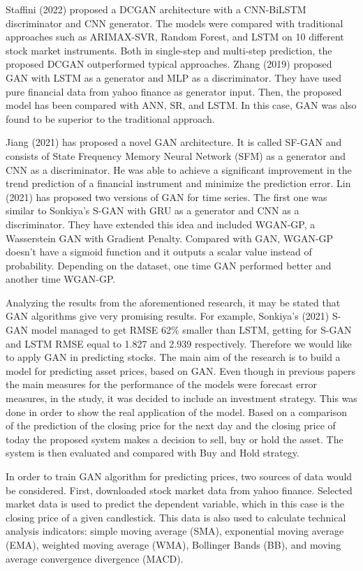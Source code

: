 \documentclass[review]{elsarticle} %
\begin{document}
Staffini (2022) proposed a DCGAN architecture with a CNN-BiLSTM discriminator and CNN generator. The models were compared with traditional approaches such as ARIMAX-SVR, Random Forest, and LSTM on 10 different stock market instruments. Both in single-step and multi-step prediction, the proposed DCGAN outperformed typical approaches. Zhang (2019) proposed GAN with LSTM as a generator and MLP as a discriminator. They have used pure financial data from yahoo finance as generator input. Then, the proposed model has been compared with ANN, SR, and LSTM. In this case, GAN was also found to be superior to the traditional approach.  

Jiang (2021) has proposed a novel GAN architecture. It is called SF-GAN and consists of 
State Frequency Memory Neural Network (SFM) as a generator and CNN as a discriminator. 
He was able to achieve a significant improvement in the trend prediction of a financial instrument and minimize the prediction error.  Lin (2021) has proposed two versions of GAN for time series. The first one was similar to Sonkiya's S-GAN with GRU as a generator and CNN as a discriminator. They have extended this idea and included WGAN-GP, a Wasserstein GAN with Gradient Penalty. Compared with GAN, WGAN-GP doesn't have a sigmoid function and it outputs a scalar value instead of probability. Depending on the dataset, one time GAN performed better and another time WGAN-GP.

Analyzing the results from the aforementioned research, it may be stated that GAN algorithms give very promising results. For example, Sonkiya's (2021) S-GAN model managed to get RMSE 62$\% $ smaller than LSTM, getting for S-GAN and LSTM RMSE equal to 1.827 and 2.939 respectively. Therefore we would like to apply GAN in predicting stocks. The main aim of the research is to build a model for predicting asset prices, based on GAN. Even though in previous papers the main measures for the performance of the models were forecast error measures, in the study, it was decided to include an investment strategy. This was done in order to show the real application of the model. Based on a comparison of the prediction of the closing price for the next day and the closing price of today the proposed system makes a decision to sell, buy or hold the asset. The system is then evaluated and compared with Buy and Hold strategy.

In order to train GAN algorithm for predicting prices, two sources of data would be considered. First, downloaded stock market data from yahoo finance. Selected market data is used to predict the dependent variable, which in this case is the closing price of a given candlestick. This data is also used to calculate technical analysis indicators: simple moving average (SMA), exponential moving average (EMA), weighted moving average (WMA), Bollinger Bands (BB), and moving average convergence divergence (MACD). 
\end{document}

